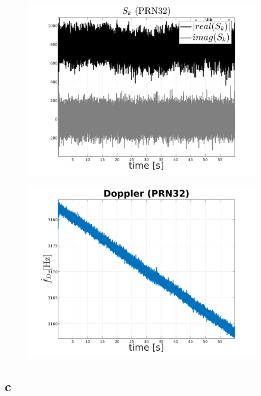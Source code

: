 \begin{figure}[H]
	\centering
	\includegraphics[width=0.9\textwidth]{fig/sk_PRN32.png}
\end{figure}

\begin{figure}[H]
	\centering
	\includegraphics[width=0.9\textwidth]{fig/doppler_PRN32.png}
\end{figure}

\subsection{c}

